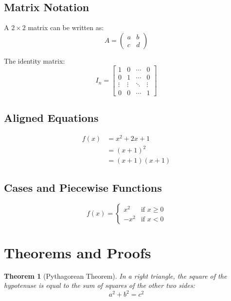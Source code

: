 \documentclass[12pt,a4paper]{article}
\newtheorem{theorem}{Theorem}[section]
\theoremstyle{definition}
\theoremstyle{remark}
\begin{document}
\subsection{Matrix Notation}

A $2 \times 2$ matrix can be written as:
\[
A = \begin{pmatrix}
a & b \\
c & d
\end{pmatrix}
\]

The identity matrix:
\begin{equation}
I_n = \begin{bmatrix}
1 & 0 & \cdots & 0 \\
0 & 1 & \cdots & 0 \\
\vdots & \vdots & \ddots & \vdots \\
0 & 0 & \cdots & 1
\end{bmatrix}
\end{equation}

\subsection{Aligned Equations}

\begin{align}
f(x) &= x^2 + 2x + 1 \\
     &= (x + 1)^2 \\
     &= (x + 1)(x + 1)
\end{align}

\subsection{Cases and Piecewise Functions}

\begin{equation}
f(x) = \begin{cases}
x^2 & \text{if } x \geq 0 \\
-x^2 & \text{if } x < 0
\end{cases}
\end{equation}

\section{Theorems and Proofs}

\begin{theorem}[Pythagorean Theorem]
\label{thm:pythagoras}
In a right triangle, the square of the hypotenuse is equal to the sum of squares of the other two sides:
\[
a^2 + b^2 = c^2
\]
\end{theorem}
\end{document}
